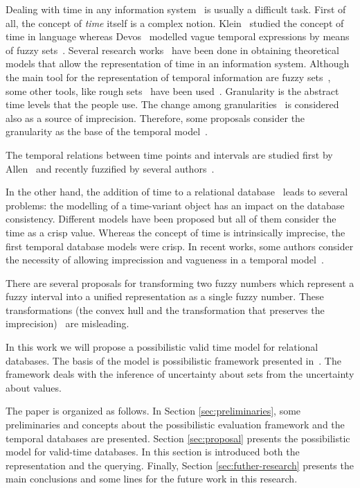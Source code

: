 Dealing with time in any information system~\cite{Bolour82} is usually a difficult task. First of all, the concept of \emph{time} itself is a complex notion. Klein~\cite{klein94} studied the concept of time in language whereas Devos~\cite{devos94} modelled vague temporal expressions by means of fuzzy sets~\cite{zadeh65}.  Several research works~\cite{cruyssen97,devos98,Cru97} have been done in obtaining theoretical models that allow the representation of time in an information system. Although the main tool for the representation of temporal information are fuzzy sets~\cite{Virant199639,35337,343607,nagypal03,Dubois:jucs_9_9:fuzziness_and_uncertainty_in}, some other tools, like rough sets~\cite{pawlak95} have been used~\cite{Qia09}.
Granularity is the abstract time levels that the people use. The change among granularities~\cite{Lin97} is considered also as a source of imprecision. Therefore, some proposals consider the granularity as the base of the temporal model~\cite{Cru97}.

The temporal relations between time points and intervals are studied first by Allen~\cite{Allen83} and recently fuzzified by several authors~\cite{ohlbach04,nagypal03,schockaert08}.

In the other hand, the addition of time to a relational database~\cite{Dyreson1994} leads to several problems: the modelling of a time-variant object has an impact on the database consistency. Different models have been proposed \cite{Jensen94,TSQL,Sarda90,Jensen91,Snodgrass84,Nascimento95} but all of them consider the time as a crisp value. 
Whereas the concept of time is intrinsically imprecise, the first temporal database models were crisp.
In recent works, some authors consider the necessity of allowing imprecission and vagueness in a temporal model~\cite{Cru97,624013,fuzz2009,gal01}. 

There are several proposals for transforming two fuzzy numbers which represent a fuzzy interval into a unified representation as a single fuzzy number. These transformations (the convex hull and the transformation that preserves the imprecision)~\cite{fuzz2009} are misleading. 

In this work we will propose a possibilistic valid time model for relational databases. The basis of the model is possibilistic framework presented in~\cite{Pon11}. The framework deals with the inference of uncertainty about sets from the uncertainty about values. 

The paper is organized as follows. In Section \ref{sec:preliminaries}, some preliminaries and concepts about the possibilistic evaluation framework and the temporal databases are presented. 
Section \ref{sec:proposal} presents the possibilistic model for valid-time databases. In this section is introduced both the representation and the querying.
Finally, Section \ref{sec:futher-research} presents the main conclusions and some lines for the future work in this research.